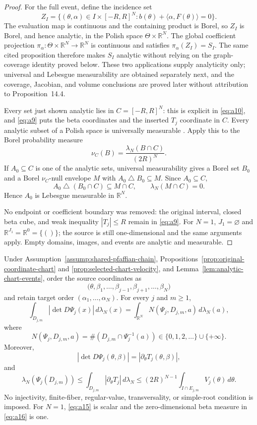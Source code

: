 \begin{proof}
For the full event, define the incidence set
\[
Z_I=\{(\theta,\alpha)\in I\times[-R,R]^N:
 b(\theta)+\langle\alpha,F(\theta)\rangle=0\}.
\tag{A13}\label{eq:a13}
\]
The evaluation map is continuous and the containing product is Borel, so
$Z_I$ is Borel, and hence analytic, in the Polish space
$\Theta\times\mathbb R^N$.  The global coefficient projection
$\pi_\alpha:\Theta\times\mathbb R^N\to\mathbb R^N$ is continuous and
satisfies $\pi_\alpha(Z_I)=S_I$.  The same cited proposition therefore makes
$S_I$ analytic without relying on the graph-coverage identity proved below.
These two applications supply analyticity only; universal and Lebesgue
measurability are obtained separately next, and the coverage, Jacobian, and
volume conclusions are proved later without attribution to Proposition~14.4.

Every set just shown analytic lies in $C=[-R,R]^N$: this is explicit in
\eqref{eq:a10}, and \eqref{eq:a9} puts the beta coordinates and the
inserted $T_j$ coordinate in $C$.  Every analytic subset of a Polish space
is universally measurable
\citep[Section~21, Theorem~21.10, p.~155]{Kechris1995}.  Apply this to the
Borel probability measure
\[
\nu_C(B)=\frac{\lambda_N(B\cap C)}{(2R)^N}.
\]
If $A_0\subseteq C$ is one of the analytic sets, universal measurability
gives a Borel set $B_0$ and a Borel $\nu_C$-null envelope $M$ with
$A_0\mathbin\triangle B_0\subseteq M$.  Since $A_0\subseteq C$,
\[
A_0\mathbin\triangle(B_0\cap C)\subseteq M\cap C,
\qquad \lambda_N(M\cap C)=0.
\]
Hence $A_0$ is Lebesgue measurable in $\mathbb R^N$.

No endpoint or coefficient boundary was removed: the original interval,
closed beta cube, and weak inequality $|T_j|\leq R$ remain in
\eqref{eq:a9}.  For $N=1$, $J_1=\varnothing$ and
$\mathbb R^{J_1}=\mathbb R^0=\{()\}$; the source is still
one-dimensional and the same arguments apply.  Empty domains, images, and
events are analytic and measurable.
\end{proof}

\begin{proposition}
\label{prop:localized-area-sweep}
Under Assumption~\ref{assump:shared-pfaffian-chain},
Propositions~\ref{prop:original-coordinate-chart} and
\ref{prop:selected-chart-velocity}, and
Lemma~\ref{lem:analytic-chart-events}, order the source coordinates as
\[
\bigl(\theta,\beta_1,\ldots,\beta_{j-1},
\beta_{j+1},\ldots,\beta_N\bigr)
\]
and retain target order $(\alpha_1,\ldots,\alpha_N)$.  For every $j$ and
$m\geq1$,
\[
\int_{D_{j,m}}|\det D\Psi_j(x)|\,d\lambda_N(x)
=\int_{\mathbb R^N}N(\Psi_j,D_{j,m},a)\,d\lambda_N(a),
\tag{A14}\label{eq:a14}
\]
where
\[
N(\Psi_j,D_{j,m},a)
=\#(D_{j,m}\cap\Psi_j^{-1}(a))
\in\{0,1,2,\ldots\}\cup\{+\infty\}.
\]
Moreover,
\[
|\det D\Psi_j(\theta,\beta)|
=|\partial_\theta T_j(\theta,\beta)|,
\tag{A15}\label{eq:a15}
\]
and
\[
\lambda_N(\Psi_j(D_{j,m}))
\leq\int_{D_{j,m}}|\partial_\theta T_j|\,d\lambda_N
\leq(2R)^{N-1}\int_{I\cap E_{j,m}}V_j(\theta)\,d\theta.
\tag{A16}\label{eq:a16}
\]
No injectivity, finite-fiber, regular-value, transversality, or simple-root
condition is imposed.  For $N=1$, \eqref{eq:a15} is scalar and the
zero-dimensional beta measure in \eqref{eq:a16} is one.
\end{proposition}

